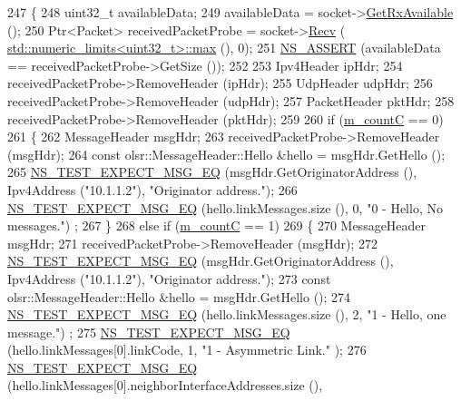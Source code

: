 \begin{DoxyCode}
247 \{
248   uint32\_t availableData;
249   availableData = socket->\hyperlink{classns3_1_1Socket_ad35d8931e53ae0754ee864acb1cecd0e}{GetRxAvailable} ();
250   Ptr<Packet> receivedPacketProbe = socket->\hyperlink{classns3_1_1Socket_a8949b1f844aae563446f2f4c5be8827a}{Recv} (
      \hyperlink{80211b_8c_affe776513b24d84b39af8ab0930fef7f}{std::numeric\_limits<uint32\_t>::max} (), 0);
251   \hyperlink{assert_8h_a6dccdb0de9b252f60088ce281c49d052}{NS\_ASSERT} (availableData == receivedPacketProbe->GetSize ());
252 
253   Ipv4Header ipHdr;
254   receivedPacketProbe->RemoveHeader (ipHdr);
255   UdpHeader udpHdr;
256   receivedPacketProbe->RemoveHeader (udpHdr);
257   PacketHeader pktHdr;
258   receivedPacketProbe->RemoveHeader (pktHdr);
259 
260   \textcolor{keywordflow}{if} (\hyperlink{classns3_1_1olsr_1_1TcRegressionTest_a7ff866c3417a672eb3bb43f08a399eaa}{m\_countC} == 0)
261     \{
262       MessageHeader msgHdr;
263       receivedPacketProbe->RemoveHeader (msgHdr);
264       \textcolor{keyword}{const} olsr::MessageHeader::Hello &hello = msgHdr.GetHello ();
265       \hyperlink{group__testing_ga7304ba46a28d8cf08dfdfd6499cf7068}{NS\_TEST\_EXPECT\_MSG\_EQ} (msgHdr.GetOriginatorAddress (), Ipv4Address (\textcolor{stringliteral}{"10.1.1.2"}),
       \textcolor{stringliteral}{"Originator address."});
266       \hyperlink{group__testing_ga7304ba46a28d8cf08dfdfd6499cf7068}{NS\_TEST\_EXPECT\_MSG\_EQ} (hello.linkMessages.size (), 0, \textcolor{stringliteral}{"0 - Hello, No messages."})
      ;
267     \}
268   \textcolor{keywordflow}{else} \textcolor{keywordflow}{if} (\hyperlink{classns3_1_1olsr_1_1TcRegressionTest_a7ff866c3417a672eb3bb43f08a399eaa}{m\_countC} == 1)
269     \{
270       MessageHeader msgHdr;
271       receivedPacketProbe->RemoveHeader (msgHdr);
272       \hyperlink{group__testing_ga7304ba46a28d8cf08dfdfd6499cf7068}{NS\_TEST\_EXPECT\_MSG\_EQ} (msgHdr.GetOriginatorAddress (), Ipv4Address (\textcolor{stringliteral}{"10.1.1.2"}),
       \textcolor{stringliteral}{"Originator address."});
273       \textcolor{keyword}{const} olsr::MessageHeader::Hello &hello = msgHdr.GetHello ();
274       \hyperlink{group__testing_ga7304ba46a28d8cf08dfdfd6499cf7068}{NS\_TEST\_EXPECT\_MSG\_EQ} (hello.linkMessages.size (), 2, \textcolor{stringliteral}{"1 - Hello, one message."})
      ;
275       \hyperlink{group__testing_ga7304ba46a28d8cf08dfdfd6499cf7068}{NS\_TEST\_EXPECT\_MSG\_EQ} (hello.linkMessages[0].linkCode, 1, \textcolor{stringliteral}{"1 - Asymmetric Link."}
      );
276       \hyperlink{group__testing_ga7304ba46a28d8cf08dfdfd6499cf7068}{NS\_TEST\_EXPECT\_MSG\_EQ} (hello.linkMessages[0].neighborInterfaceAddresses.size (),

\end{DoxyCode}
